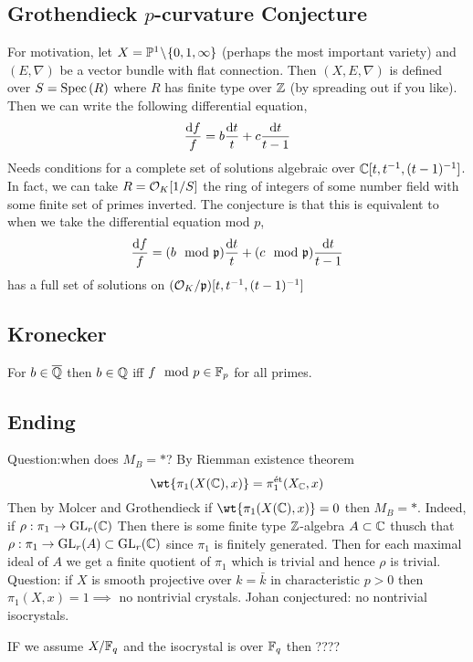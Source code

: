 \documentclass[12pt]{article}
\begin{document}
\subsection{Grothendieck $p$-curvature Conjecture}

For motivation, let $X = \mathbb{P}^1 \! \setminus \! \{ 0,1, \infty \}$ (perhaps the most important variety) and $(E, \nabla)$ be a vector bundle with flat connection. Then $(X, E, \nabla)$ is defined over $S = \mathrm{Spec}\left( R \right)$ where $R$ has finite type over $\mathbb{Z}$ (by spreading out if you like). Then we can write the following differential equation,
\[ \frac{\mathrm{d}{f}}{f} = b \frac{\mathrm{d}{t}}{t} + c \frac{\mathrm{d}{t}}{t - 1} \]
Needs conditions for a complete set of solutions algebraic over $\mathbb{C}[t, t^{-1}, (t-1)^{-1}]$. In fact, we can take $R = \mathcal{O}_{K}[1/S]$ the ring of integers of some number field with some finite set of primes inverted. The conjecture is that this is equivalent to when we take the differential equation mod $p$,
\[ \frac{\mathrm{d}{f}}{f} = (b \mod {\mathfrak{p}}) \frac{\mathrm{d}{t}}{t} + (c \mod {\mathfrak{p}}) \frac{\mathrm{d}{t}}{t-1} \]
has a full set of solutions on $(\mathcal{O}_{K} / \mathfrak{p})[t, t^{-1}, (t-1)^{-1}]$ 

\subsection{Kronecker}

For $b \in \overline{\mathbb{Q}}$ then $b \in \mathbb{Q}$ iff $f \mod p \in \mathbb{F}_p$ for all primes.

\subsection{Ending}

Question:when does $M_B = *$? By Riemman existence theorem 
\[ \wt{\pi_1(X(\CC), x)} = \pi_1^{\et}(X_{\CC}, x) \]
Then by Molcer and Grothendieck if $\wt{\pi_1(X(\CC), x)} = 0$ then $M_B = *$. Indeed, if $\rho : \pi_1 \to \mathrm{GL}_r(\mathbb{C})$ Then there is some finite type $\mathbb{Z}$-algebra $A \subset \mathbb{C}$ thusch that $\rho : \pi_1 \to \mathrm{GL}_r(A) \subset \mathrm{GL}_r(\mathbb{C})$ since $\pi_1$ is finitely generated. Then for each maximal ideal of $A$ we get a finite quotient of $\pi_1$ which is trivial and hence $\rho$ is trivial. 
\bigskip\\
Question: if $X$ is smooth projective over $k = \bar{k}$ in characteristic $p > 0$ then $\pi_1(X, x) = 1 \implies$ no nontrivial crystals. Johan conjectured: no nontrivial isocrystals. 

\begin{rmk}
IF we assume $X / \mathbb{F}_q$ and the isocrystal is over $\mathbb{F}_q$ then ????
\end{rmk}  
\end{document}
